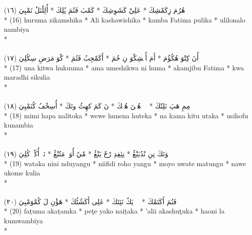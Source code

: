 \documentclass[a4paper, 12pt]{report}
\begin{document}
\begin{center}
\textarabic{(١٦) \textcolor{mygreen}{هُرُمَ زِكَمْشِكَ  * عَلِيْ كَشَوِشِكَ  * كَمْبَ فَتُمَ پُلِكَ  * أُلِلٗنَلٗ نَمْبِيَ }} \\* 
(16) huruma zikamshika  * Ali kashawishika  * kamba Fatima pulika  * ulilonalo nambiya  \\* 
 \\ 
\\[8mm] 

\textarabic{(١٧) \textcolor{mygreen}{أُنَ كِتْوَ هُكُؤُمَ  * أَمَ أُمٖشِكْوَ نِ حُمَ  * أَكَمْجِبُ فَتُمَ  * كْوَ مَرَضِ سِكُلِيَ }} \\* 
(17) una kitwa hukuuma  * ama umeshikwa ni huma  * akamjibu Fatima  * kwa maradhi sikulia  \\* 
 \\ 
\\[8mm] 

\textarabic{(١٨) \textcolor{mygreen}{مِمِ هَپَ نَلِتٗكَ  * وٖوٖ هُنٖنَ هُتٖكَ  * نَ كَمَ كهِٹُ وتَكَ  * أُسِخٗفُ كُنَمْبِيَ }} \\* 
(18) mimi hapa nalitoka  * wewe hunena huteka  * na kama kitu utaka  * usihofu kunambia  \\* 
 \\ 
\\[8mm] 

\textarabic{(١٩) \textcolor{mygreen}{وَتَكَ نِنِ نْدُيَنْڠُ  * نِئِفِدِ رٗحٗ يَنْڠُ  * مٗيٗ أُوَتٖ مَتُنْڠُ  * نَوٖ أُكٗمٖ كُلِيَ }} \\* 
(19) wataka nini nduyangu  * niifidi roho yangu  * moyo uwate matungu  * nawe ukome kulia  \\* 
 \\ 
\\[8mm] 

\textarabic{(٢٠) \textcolor{mygreen}{فَتُمَ أَكَتَمْكَ  * پٖٹٖ يَكٗ نَئِتَكَ  * عَلِى أَكَشُٹُكَ  * هَؤٗنِ لَ كُمْوَمْبِيَ }} \\* 
(20) faṯuma akaṯamka  * peţe yako naiṯaka  * 'alii akashuţuka  * haoni la kumwambiya  \\* 
 \\ 
\\[8mm] 


\end{center}
\end{document}
